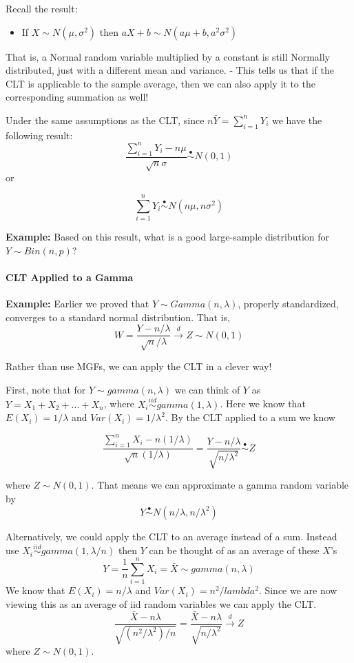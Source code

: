 \documentclass[
]{article}
\providecommand{\tightlist}{%
  \setlength{\itemsep}{0pt}\setlength{\parskip}{0pt}}
\begin{document}
Recall the result:

\begin{itemize}
\tightlist
\item
  If \(X\sim N(\mu, \sigma^2)\) then \(aX+b\sim N(a\mu+b,a^2\sigma^2)\)
\end{itemize}

That is, a Normal random variable multiplied by a constant is still
Normally distributed, just with a different mean and variance. - This
tells us that if the CLT is applicable to the sample average, then we
can also apply it to the corresponding summation as well!

Under the same assumptions as the CLT, since
\(n\bar{Y} = \sum_{i=1}^{n}Y_i\) we have the following result:
\[\frac{\sum_{i=1}^{n} Y_i -n\mu}{\sqrt{n}\sigma}\stackrel{\bullet}{\sim}N(0, 1)\]
or

\[\sum_{i=1}^{n} Y_i \stackrel{\bullet}{\sim}N(n\mu, n\sigma^2)\]

\textbf{Example:} Based on this result, what is a good large-sample
distribution for \(Y\sim Bin(n, p)\)?

\hypertarget{clt-applied-to-a-gamma}{%
\paragraph{CLT Applied to a Gamma}\label{clt-applied-to-a-gamma}}

\textbf{Example:} Earlier we proved that \(Y\sim Gamma(n, \lambda)\),
properly standardized, converges to a standard normal distribution. That
is,
\[W = \frac{Y-n/\lambda}{\sqrt{n}/\lambda}\stackrel{d}{\rightarrow} Z \sim N(0,1)\]

Rather than use MGFs, we can apply the CLT in a clever way!

First, note that for \(Y\sim gamma(n,\lambda)\) we can think of \(Y\) as
\(Y=X_1+X_2+...+X_{n}\), where
\(X_i\stackrel{iid}\sim gamma(1,\lambda)\). Here we know that
\(E(X_i) = 1/\lambda\) and \(Var(X_i) = 1/\lambda^2\). By the CLT
applied to a sum we know

\[\frac{\sum_{i=1}^{n} X_i -n(1/\lambda)}{\sqrt{n}(1/\lambda)} = \frac{Y-n/\lambda}{\sqrt{n/\lambda^2}}\stackrel{\bullet}{\sim}Z\]

where \(Z\sim N(0,1)\). That means we can approximate a gamma random
variable by \[Y \stackrel{\bullet}{\sim} N(n/\lambda, n/\lambda^2)\]

Alternatively, we could apply the CLT to an average instead of a sum.
Instead use \(X_i\stackrel{iid}{\sim}gamma(1,\lambda/n)\) then \(Y\) can
be thought of as an average of these \(X\)'s
\[Y=\frac{1}{n}\sum_{i=1}^{n}X_i=\bar{X}\sim gamma(n,\lambda)\] We know
that \(E(X_i) = n/\lambda\) and \(Var(X_i) = n^2/lambda^2\). Since we
are now viewing this as an average of iid random variables we can apply
the CLT.\\
\[\frac{\bar{X}-n\lambda}{\sqrt{(n^2/\lambda^2)/n}}=\frac{\bar{X}-n\lambda}{\sqrt{n/\lambda^2}}\stackrel{d}\rightarrow Z\]
where \(Z\sim N(0,1)\).
\end{document}
